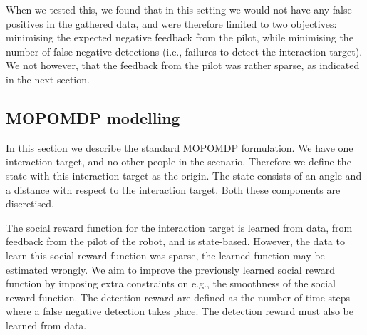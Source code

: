 \documentclass[a4paper,11pt]{report}
\begin{document}
When we tested this, we found that in this setting we would not have any false positives in the gathered data, and were therefore limited to two objectives: minimising the expected negative feedback from the pilot, while minimising the number of false negative detections (i.e., failures to detect the interaction target). We not however, that the feedback from the pilot was rather sparse, as indicated in the next section. 

\subsection{MOPOMDP modelling}

In this section we describe the standard MOPOMDP formulation. We have one interaction target, and no other people in the scenario. Therefore we define the state with this interaction target as the origin. The state consists of an angle and a distance with respect to the interaction target. Both these components are discretised. 


The social reward function for the interaction target is learned from data, from feedback from the pilot of the robot, and is state-based. However, the data to learn this social reward function was sparse, the learned function may be estimated wrongly. We aim to improve the previously learned social reward function by imposing extra constraints on e.g., the smoothness of the social reward function. The detection reward are defined as the number of time steps where a false negative detection takes place.  The detection reward must also be learned from data.
\end{document}

